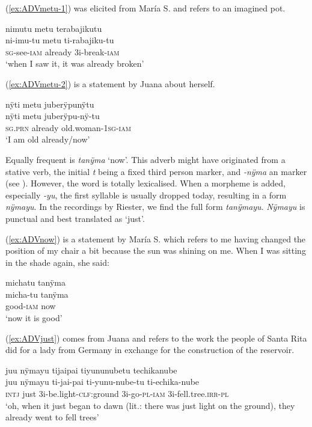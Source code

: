 (\ref{ex:ADVmetu-1}) was elicited from María S. and refers to an imagined pot.

\ea\label{ex:ADVmetu-1}
\begingl
\glpreamble nimutu metu terabajikutu\\
\gla ni-imu-tu metu ti-rabajiku-tu\\
\textsc{sg}-see-\textsc{iam} already 3i-break-\textsc{iam}\\
\glft ‘when I saw it, it was already broken’
\endgl
{}
\xe

(\ref{ex:ADVmetu-2}) is a statement by Juana about herself.

\ea\label{ex:ADVmetu-2}
\begingl
\glpreamble nÿti metu juberÿpunÿtu\\
\gla nÿti metu juberÿpu-nÿ-tu\\
\textsc{sg.prn} already old.woman-1\textsc{sg}-\textsc{iam}\\
\glft ‘I am old already/now’
\endgl
\trailingcitation{[jxx-p110923l-1.205]}
\xe

Equally frequent is \textit{tanÿma} ‘now’. This adverb might have originated from a stative verb, the initial \textit{t} being a fixed third person marker, and \textit{-nÿma} an  marker (see ). However, the word is totally lexicalised. When a morpheme is added, especially \textit{-yu}, the first syllable is usually dropped today, resulting in a form \textit{nÿmayu}. In the recordings by Riester, we find the full form \textit{tanÿmayu}. \textit{Nÿmayu} is punctual and best translated as ‘just’.

(\ref{ex:ADVnow}) is a statement by María S. which refers to me having changed the position of my chair a bit because the sun was shining on me. When I was sitting in the shade again, she said:

\ea\label{ex:ADVnow}
\begingl
\glpreamble michatu tanÿma\\
\gla micha-tu tanÿma\\
\glb good-\textsc{iam} now\\
\glft ‘now it is good’
\endgl
\trailingcitation{[rxx-e181024l.019]}
\xe

(\ref{ex:ADVjust}) comes from Juana and refers to the work the people of Santa Rita did for a lady from Germany in exchange for the construction of the reservoir.

\ea\label{ex:ADVjust}
\begingl
\glpreamble juu nÿmayu tijaipai tiyununubetu techikanube\\
\gla juu nÿmayu ti-jai-pai ti-yunu-nube-tu ti-echika-nube\\
\glb \textsc{intj} just 3i-be.light-\textsc{clf:}ground 3i-go-\textsc{pl}-\textsc{iam} 3i-fell.tree.\textsc{irr}-\textsc{pl}\\
\glft ‘oh, when it just began to dawn (lit.: there was just light on the ground), they already went to fell trees’
\endgl
\trailingcitation{[jxx-p120515l-2.179]}
\xe

